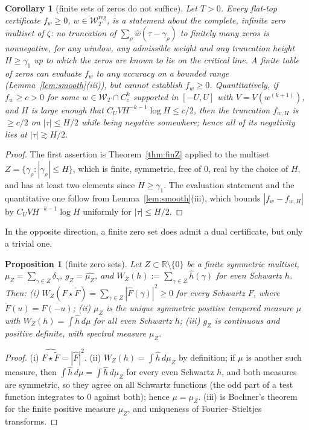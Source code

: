 \documentclass[11pt]{amsart}
\newtheorem{proposition}[theorem]{Proposition}
\newtheorem{corollary}[theorem]{Corollary}
\theoremstyle{definition}
\theoremstyle{remark}
\newcommand{\R}{\mathbb R}
\newcommand{\wh}{\widehat w}
\newcommand{\Fh}{\widehat F}
\newcommand{\Wcl}{\mathcal W_T}
\begin{document}
\begin{corollary}[finite sets of zeros do not suffice]\label{cor:infinite}
Let $T>0$. Every flat-top certificate $f_w\ge0$, $w\in\Wcl^{\mathrm{reg}}$, is a statement about the complete,
infinite zero multiset of $\zeta$: no truncation of $\sum_\rho\wh(\tau-\gamma_\rho)$ to finitely many
zeros is nonnegative, for any window, any admissible weight and any truncation height $H\ge\gamma_1$ up
to which the zeros are known to lie on the critical line. A finite
table of zeros can evaluate $f_w$ to any accuracy on a bounded range (Lemma~\ref{lem:smooth}(iii)),
but cannot establish $f_w\ge0$. Quantitatively, if $f_w\ge c>0$ for some $w\in\Wcl\cap C_c^k$
supported in $[-U,U]$ with $V=V(w^{(k+1)})$, and $H$ is large enough that
$C_UVH^{-k-1}\log H\le c/2$, then the truncation $f_{w,H}$ is $\ge c/2$ on
$|\tau|\le H/2$ while being negative somewhere; hence all of its negativity lies at
$|\tau|\gtrsim H/2$.
\end{corollary}
\begin{proof}
The first assertion is Theorem~\ref{thm:finZ} applied to the multiset
$Z=\{\gamma_\rho:|\gamma_\rho|\le H\}$, which is finite, symmetric, free of $0$, real by the choice of
$H$, and has at least two elements since $H\ge\gamma_1$. The
evaluation statement and the quantitative one follow from Lemma~\ref{lem:smooth}(iii), which bounds
$|f_w-f_{w,H}|$ by $C_UVH^{-k-1}\log H$ uniformly for $|\tau|\le H/2$.
\end{proof}


In the opposite direction, a finite zero set does admit a dual certificate, but only a trivial one.

\begin{proposition}[finite zero sets]\label{prop:finuniv}
Let $Z\subset\R\setminus\{0\}$ be a finite symmetric multiset, $\mu_Z=\sum_{\gamma\in Z}\delta_\gamma$,
$g_Z=\widehat{\mu_Z}$, and $W_Z(h):=\sum_{\gamma\in Z}\widehat h(\gamma)$ for even Schwartz $h$. Then:
\emph{(i)} $W_Z(F\star\widetilde F)=\sum_{\gamma\in Z}|\Fh(\gamma)|^2\ge0$ for every Schwartz $F$, where
$\widetilde F(u)=\overline{F(-u)}$;
\emph{(ii)} $\mu_Z$ is the unique symmetric positive tempered measure $\mu$ with
$W_Z(h)=\int\widehat h\,d\mu$ for all even Schwartz $h$;
\emph{(iii)} $g_Z$ is continuous and positive definite, with spectral measure $\mu_Z$.
\end{proposition}
\begin{proof}
(i) $\widehat{F\star\widetilde F}=|\Fh|^2$. (ii) $W_Z(h)=\int\widehat h\,d\mu_Z$ by definition; if $\mu$ is
another such measure, then $\int\widehat h\,d\mu=\int\widehat h\,d\mu_Z$ for every even Schwartz $h$, and
both measures are symmetric, so they agree on all Schwartz functions (the odd part of a test function
integrates to $0$ against both); hence $\mu=\mu_Z$. (iii) is Bochner's theorem for the finite positive
measure $\mu_Z$, and uniqueness of Fourier--Stieltjes transforms.
\end{proof}
\end{document}
